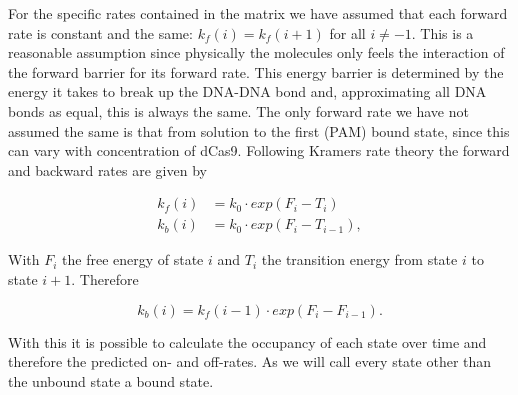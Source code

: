 For the specific rates contained in the matrix we have assumed that each forward rate is constant and the same: $k_f(i) = k_f(i+1)$ for all $i \neq -1$. This is a reasonable assumption since physically the molecules only feels the interaction of the forward barrier for its forward rate. This energy barrier is determined by the energy it takes to break up the DNA-DNA bond and, approximating all DNA bonds as equal, this is always the same. The only forward rate we have not assumed the same is that from solution to the first (PAM) bound state, since this can vary with concentration of dCas9.
Following Kramers rate theory the forward and backward rates are given by

\begin{align*}
k_f(i) &= k_0 \cdot exp(F_i - T_i) \\
k_b(i) &= k_0 \cdot exp(F_i - T_{i-1}),
\end{align*}

With $F_i$ the free energy of state $i$ and $T_i$ the transition energy from state $i$ to state $i+1$. Therefore

\begin{equation}
k_b(i) = k_f(i-1) \cdot exp(F_{i}-F_{i-1}).
\end{equation}

With this it is possible to calculate the occupancy of each state over time and therefore the predicted on- and off-rates. As \cite{PNAS} we will call every state other than the unbound state a bound state.